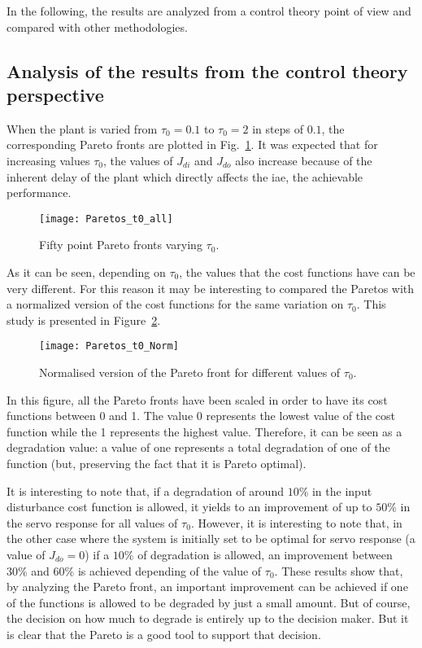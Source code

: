 In the following, the results are analyzed from a control theory point of view and compared with other methodologies.
\subsection{Analysis of the results from the control theory perspective}
\label{sec:Control}
%
When the plant is varied from $\tau_0=0.1$ to $\tau_0=2$ in steps of $0.1$, the corresponding Pareto fronts are plotted in Fig.~\ref{fig:Paretos_t0_all}. It was expected that for increasing values $\tau_0$, the values of $J_{di}$ and $J_{do}$ also increase because of the inherent delay of the plant which directly affects the \gls{iae}, the achievable performance.
%
\begin{figure}[tb]%
\centering
\texttt{[image: Paretos\_t0\_all]}%
\caption{Fifty point Pareto fronts varying $\tau_0$.}%
\label{fig:Paretos_t0_all}%
\end{figure}
%

As it can be seen, depending on $\tau_0$, the values that the cost functions have can be very different. For this reason it may be interesting to compared the Paretos with a normalized version of the cost functions for the same variation on $\tau_0$. This study is presented in Figure~\ref{fig:Paretos_t0_Norm}. %
%
\begin{figure}[tb]%
	\centering
	\texttt{[image: Paretos\_t0\_Norm]}%
	\caption{Normalised version of the Pareto front for different values of $\tau_0$.}%
	\label{fig:Paretos_t0_Norm}%
\end{figure}
%
In this figure, all the Pareto fronts have been scaled in order to have its cost functions between 0 and 1. The value 0 represents the lowest value of the cost function while the 1 represents the highest value. Therefore, it can be seen as a degradation value: a value of one represents a total degradation of one of the function (but, preserving the fact that it is Pareto optimal).

It is interesting to note that, if a degradation of around $10\%$ in the input disturbance cost function is allowed, it yields to an improvement of up to $50\%$ in the servo response for all values of $\tau_0$. However, it is interesting to note that, in the other case where the system is initially set to be optimal for servo response (a value of $J_{do} = 0$) if a $10\%$ of degradation is allowed, an improvement between 30\% and 60\% is achieved depending of the value of $\tau_0$. These results show that, by analyzing the Pareto front, an important improvement can be achieved if one of the functions is allowed to be degraded  by just a small amount. But of course, the decision on how much to degrade is entirely up to the decision maker. But it is clear that the Pareto is a good tool to support that decision.

